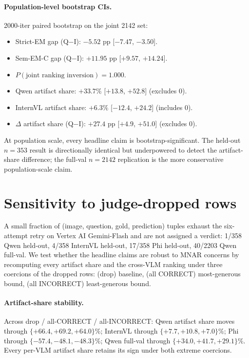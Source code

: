 \paragraph{Population-level bootstrap CIs.}
2000-iter paired bootstrap on the joint 2142 set:
\begin{itemize}
\item Strict-EM gap (Q$-$I): $-5.52$ pp [$-7.47$, $-3.50$].
\item Sem-EM-C gap (Q$-$I): $+11.95$ pp [$+9.57$, $+14.24$].
\item $P(\text{joint ranking inversion}) = 1.000$.
\item Qwen artifact share: $+33.7\%$ [$+13.8$, $+52.8$] (excludes 0).
\item InternVL artifact share: $+6.3\%$ [$-12.4$, $+24.2$] (includes 0).
\item $\Delta$ artifact share (Q$-$I): $+27.4$ pp [$+4.9$, $+51.0$] (excludes 0).
\end{itemize}
At population scale, every headline claim is bootstrap-significant. The held-out $n=353$ result is directionally identical but underpowered to detect the artifact-share difference; the full-val $n=2142$ replication is the more conservative population-scale claim.

\section{Sensitivity to judge-dropped rows}
\label{app:dropped-sensitivity}

A small fraction of (image, question, gold, prediction) tuples exhaust the six-attempt retry on Vertex AI Gemini-Flash and are not assigned a verdict: 1/358 Qwen held-out, 4/358 InternVL held-out, 17/358 Phi held-out, 40/2203 Qwen full-val. We test whether the headline claims are robust to MNAR concerns by recomputing every artifact share and the cross-VLM ranking under three coercions of the dropped rows: (drop) baseline, (all CORRECT) most-generous bound, (all INCORRECT) least-generous bound.

\paragraph{Artifact-share stability.}
Across drop / all-CORRECT / all-INCORRECT: Qwen artifact share moves through $\{+66.4, +69.2, +64.0\}\%$; InternVL through $\{+7.7, +10.8, +7.0\}\%$; Phi through $\{-57.4, -48.1, -48.3\}\%$; Qwen full-val through $\{+34.0, +41.7, +29.1\}\%$. Every per-VLM artifact share retains its sign under both extreme coercions.

